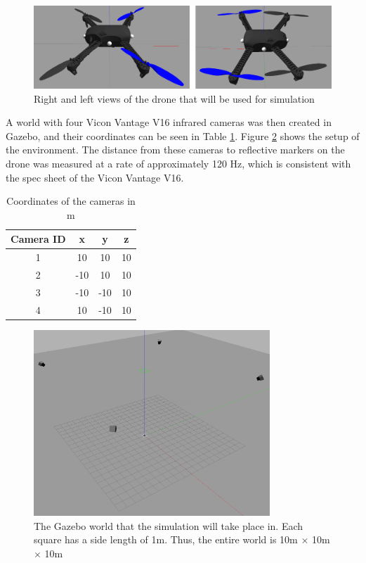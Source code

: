 \documentclass[letterpaper, paper,11pt]{AAS}	%
\begin{document}
\begin{figure}[htb]
	\centering\includegraphics[width=5in]{Figures/DroneModel}
	\caption{Right and left views of the drone that will be used for simulation}
	\label{fig:DroneModel}
\end{figure}

A world with four Vicon Vantage V16 infrared cameras\cite{vicon_2022} was then created in Gazebo, and their coordinates can be seen in Table \ref{tab:cameras}. Figure \ref{fig:GazeboWorld} shows the setup of the environment. The distance from these cameras to reflective markers on the drone was measured at a rate of approximately 120 Hz, which is consistent with the spec sheet of the Vicon Vantage V16\cite{vicon_2022}.


\begin{table}[htbp]
	\fontsize{10}{10}\selectfont
    \caption{Coordinates of the cameras in m}
   \label{tab:cameras}
        \centering 
   \begin{tabular}{c | c | c | c} %
      \hline 
      Camera ID    & x & y & z \\
      \hline 
      1      & 10 & 10 & 10 \\
      2      & -10 & 10 & 10 \\
      3      & -10 & -10 & 10 \\
      4      & 10 & -10 & 10 \\
      \hline
   \end{tabular}
\end{table}

\begin{figure}[htb]
	\centering\includegraphics[width=3.5in]{Figures/GazeboWorld}
	\caption{The Gazebo world that the simulation will take place in. Each square has a side length of 1m. Thus, the entire world is 10m $\times$ 10m $\times$ 10m}
	\label{fig:GazeboWorld}
\end{figure}
\end{document}
